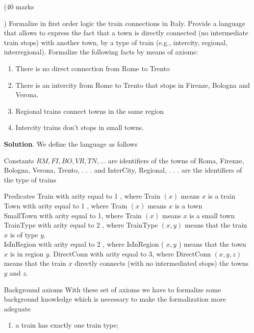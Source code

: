{\begin{problem}(40 marks\addtocounter{marks}{40})%
Formalize in first order logic the train connections in Italy. Provide a language that allows to express the fact that a town is directly connected (no intermediate train stops) with another town, by a type of train (e.g., intercity, regional, interregional). Formalize the following facts by means of axioms:

\begin{enumerate}
  \item There is no direct connection from Rome to Trento
  \item There is an intercity from Rome to Trento that stops in Firenze, Bologna and Verona.
  \item Regional trains connect towns in the same region
  \item Intercity trains don't stops in small towns.
\end{enumerate}

\end{problem}
\begin{sol}{\color{sol}
\textbf{Solution}. We define the language as follows

Constants $RM, FI, BO, VR, TN, \ldots$ are identifiers of the towns of Roma, Firenze, Bologna, Verona, Trento, . . . and InterCity, Regional, . . . are the identifiers of the type of trains

Predicates Train with arity equal to 1 , where Train $(x)$ means $x$ is a train Town with arity equal to 1 , where Train $(x)$ means $x$ is a town\\
SmallTown with arity equal to 1, where Train $(x)$ means $x$ is a small town TrainType with arity equal to 2 , where TrainType $(x, y)$ means that the train $x$ is of type $y$.\\
IsInRegion with arity equal to 2 , where IsInRegion ( $x, y$ ) means that the town $x$ is in region $y$. DirectConn with arity equal to 3, where DirectConn $(x, y, z)$ means that the train $x$ directly connects (with no intermediated stops) the towns $y$ and $z$.

Background axioms With these set of axioms we have to formalize some background knowledge which is necessary to make the formalization more adeguate

\begin{enumerate}
  \item a train has exactly one train type;
\end{enumerate}


}
\end{sol}}
